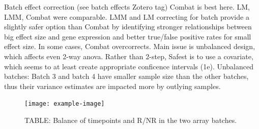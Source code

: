 \begin{outline}
Batch effect correction (see batch effects Zotero tag)
Combat is best here.
LM, LMM, Combat were comparable.
LMM and LM correcting for batch provide a slightly safer option than Combat by identifying stronger relationships between big effect size and gene expression and better true/false positive rates for small effect size.
In some cases, Combat overcorrects.
Main issue is unbalanced design, which affects even 2-way anova. Rather than 2-step, Safest is to use a covariate, which seems to at least create appropriate conficence intervals (1e).
Unbalanced batches:  Batch 3 and batch 4 have smaller sample size than the other batches, thus their variance estimates are impacted more by outlying samples.

\begin{figure}
\texttt{[image: example-image]}
\caption{TABLE: Balance of timepoints and R/NR in the two array batches.}
\end{figure}


\end{outline}
